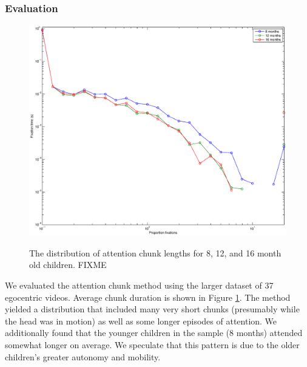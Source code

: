 \documentclass[10pt,letterpaper]{article}
\begin{document}
\subsubsection{Evaluation}

\begin{figure}[t]
\begin{center}
           \includegraphics[width=1\linewidth]{Image/attention.eps}    \label{fig:buckets}
\caption{The distribution of attention chunk lengths for 8, 12, and 16 month old children. FIXME}
\label{fig:chunks}
\end{center}
\end{figure}

We evaluated the attention chunk method using the larger dataset of 37 egocentric videos. Average chunk duration is shown in Figure \ref{fig:chunks}. The method yielded a distribution that included many very short chunks (presumably while the head was in motion) as well as some longer episodes of attention. We additionally found that the younger children in the sample (8 months) attended somewhat longer on average. We speculate that this pattern is due to the older children's greater autonomy and mobility. 
\end{document}
